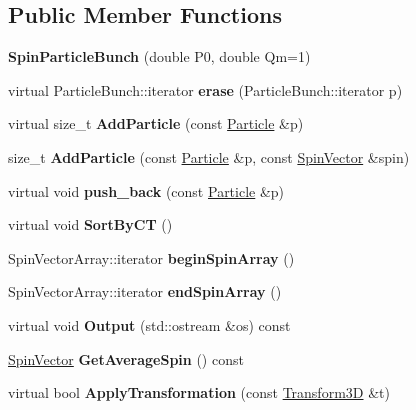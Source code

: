 \subsection*{Public Member Functions}
\begin{DoxyCompactItemize}
\item 
\mbox{\label{classSpinParticleBunch_abf2d1c2c0c13119f64fae36e82ba0ebd}} 
{\bfseries Spin\+Particle\+Bunch} (double P0, double Qm=1)
\item 
\mbox{\label{classSpinParticleBunch_a4cab0e49424e51cbc5579462f4b215c7}} 
virtual Particle\+Bunch\+::iterator {\bfseries erase} (Particle\+Bunch\+::iterator p)
\item 
\mbox{\label{classSpinParticleBunch_a6ef4483d5f4b581e560b2223ed8f945f}} 
virtual size\+\_\+t {\bfseries Add\+Particle} (const \hyperlink{classPSvector}{Particle} \&p)
\item 
\mbox{\label{classSpinParticleBunch_a3a592351c8dbfea61270e1aa56379c02}} 
size\+\_\+t {\bfseries Add\+Particle} (const \hyperlink{classPSvector}{Particle} \&p, const \hyperlink{classSpinVector}{Spin\+Vector} \&spin)
\item 
\mbox{\label{classSpinParticleBunch_ac84c5bf2b95eec06a771bf5232df7178}} 
virtual void {\bfseries push\+\_\+back} (const \hyperlink{classPSvector}{Particle} \&p)
\item 
\mbox{\label{classSpinParticleBunch_af8e8f9eb38aceb94a75ac9f143805ef9}} 
virtual void {\bfseries Sort\+By\+CT} ()
\item 
\mbox{\label{classSpinParticleBunch_a326dafe135bb0edb4a4bb34073e7c2f1}} 
Spin\+Vector\+Array\+::iterator {\bfseries begin\+Spin\+Array} ()
\item 
\mbox{\label{classSpinParticleBunch_a250dcf791c1fb22c8f20889aa57302aa}} 
Spin\+Vector\+Array\+::iterator {\bfseries end\+Spin\+Array} ()
\item 
\mbox{\label{classSpinParticleBunch_a7395dc23d3be174d09e1858e30dab952}} 
virtual void {\bfseries Output} (std\+::ostream \&os) const
\item 
\mbox{\label{classSpinParticleBunch_ab0b3c8c45fc6c450ee7560800ed10d27}} 
\hyperlink{classSpinVector}{Spin\+Vector} {\bfseries Get\+Average\+Spin} () const
\item 
\mbox{\label{classSpinParticleBunch_afca5ccc6bbe4caea6468d9055f5b1b56}} 
virtual bool {\bfseries Apply\+Transformation} (const \hyperlink{classTransform3D}{Transform3D} \&t)
\end{DoxyCompactItemize}
